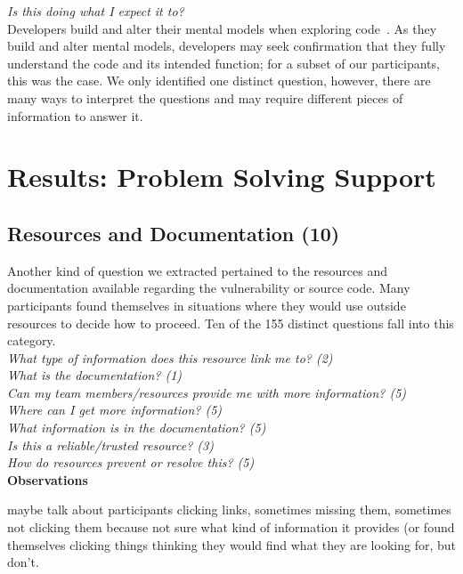 \documentclass[conference]{IEEEtran}
\begin{document}
\noindent\emph{Is this doing what I expect it to?} \\
Developers build and alter their mental models when exploring code~\cite{canas1994mental, burkhardt1997mental}. 
As they build and alter mental models, developers may seek confirmation that they fully understand the code and its intended function; for a subset of our participants, this was the case. 
We only identified one distinct question, however, there are many ways to interpret the questions and may require different pieces of information to answer it.



\section{Results: Problem Solving Support}
\label{sec:results-pss}



\noindent\subsection{\textbf{Resources and Documentation (10)}}\label{rd}


Another kind of question we extracted pertained to the resources and documentation available regarding the vulnerability or source code. 
Many participants found themselves in situations where they would use outside resources to decide how to proceed. 
Ten of the 155 distinct questions fall into this category. 
\\

\noindent\emph{What type of information does this resource link me to? (2)} \\
\emph{What is the documentation? (1)} \\
\emph{Can my team members/resources provide me with more information? (5)} \\
\emph{Where can I get more information? (5)} \\
\emph{What information is in the documentation? (5)} \\
\emph{Is this a reliable/trusted resource? (3)} \\
\emph{How do resources prevent or resolve this? (5)} \\


\noindent\textbf{Observations}

maybe talk about participants clicking links, sometimes missing them, sometimes not clicking them because not sure what kind of information it provides (or found themselves clicking things thinking they would find what they are looking for, but don't.
\\
\end{document}
